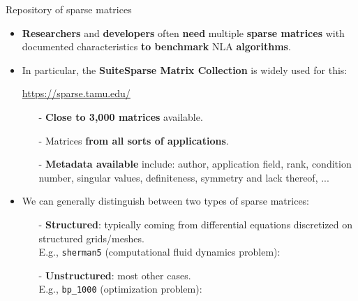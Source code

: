\documentclass[t,usepdftitle=false]{beamer}
\begin{document}
\begin{frame}{Repository of sparse matrices}
\begin{itemize}
\item \textbf{Researchers} and \textbf{developers} often \textbf{need} multiple \textbf{sparse matrices} with documented characteristics \textbf{to benchmark} NLA \textbf{algorithms}.
\item In particular, the \textbf{SuiteSparse Matrix Collection} is widely used for this:
\begin{center}\url{https://sparse.tamu.edu/}\end{center}
\begin{itemize}\normalsize
\item[-] \textbf{Close to 3,000 matrices} available.
\item[-] Matrices \textbf{from all sorts of applications}.
\item[-] \textbf{Metadata available} include: author, application field, rank, condition number, singular values, definiteness, symmetry and lack thereof, ...
\end{itemize}
\item We can generally distinguish between two types of sparse matrices:
\begin{itemize}\normalsize
\item[-] \textbf{Structured}: typically coming from differential equations discretized on structured grids/meshes.\\
E.g., \texttt{sherman5} (computational fluid dynamics problem): 
\vspace{.15cm}\\
\item[-] \textbf{Unstructured}: most other cases.\\
E.g., \texttt{bp\_1000} (optimization problem): 
\end{itemize}
\end{itemize}
\end{frame}
\end{document}
